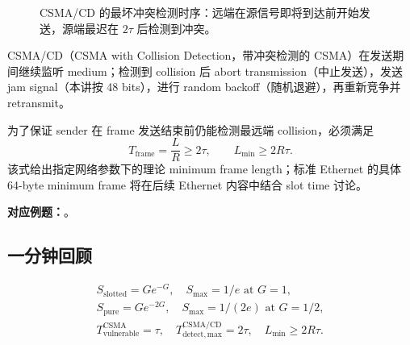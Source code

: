 \begin{figure}[htbp]
  \centering
  \resizebox{0.88\textwidth}{!}{}
  \caption{CSMA/CD 的最坏冲突检测时序：远端在源信号即将到达前开始发送，源端最迟在 $2\tau$ 后检测到冲突。}
  \label{fig:sc2008-l03-csma-cd-timing}
\end{figure}

CSMA/CD（CSMA with Collision Detection，带冲突检测的 CSMA）在发送期间继续监听 medium；检测到 collision 后 abort transmission（中止发送），发送 jam signal（本讲按 48 bits），进行 random backoff（随机退避），再重新竞争并 retransmit。

为了保证 sender 在 frame 发送结束前仍能检测最远端 collision，必须满足
\[
  T_{\mathrm{frame}}=\frac{L}{R}\ge 2\tau,
  \qquad
  \boxed{L_{\min}\ge2R\tau}.
\]
该式给出指定网络参数下的理论 minimum frame length；标准 Ethernet 的具体 64-byte minimum frame 将在后续 Ethernet 内容中结合 slot time 讨论。

\textbf{对应例题：}。

\subsection{一分钟回顾}

\[
\boxed{
\begin{gathered}
S_{\mathrm{slotted}}=Ge^{-G},\quad S_{\max}=1/e\text{ at }G=1,\\
S_{\mathrm{pure}}=Ge^{-2G},\quad S_{\max}=1/(2e)\text{ at }G=1/2,\\
T_{\mathrm{vulnerable}}^{\mathrm{CSMA}}=\tau,\quad
T_{\mathrm{detect,max}}^{\mathrm{CSMA/CD}}=2\tau,\quad
L_{\min}\ge2R\tau.
\end{gathered}}
\]
